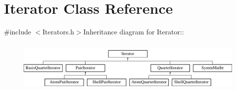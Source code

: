\hypertarget{classJKBuilder_1_1Iterator}{
\section{Iterator Class Reference}
\label{classJKBuilder_1_1Iterator}
}


{\ttfamily \#include $<$Iterators.h$>$}Inheritance diagram for Iterator::\begin{figure}[H]
\begin{center}
\leavevmode
\includegraphics[height=2.54545cm]{classJKBuilder_1_1Iterator}
\end{center}
\end{figure}
